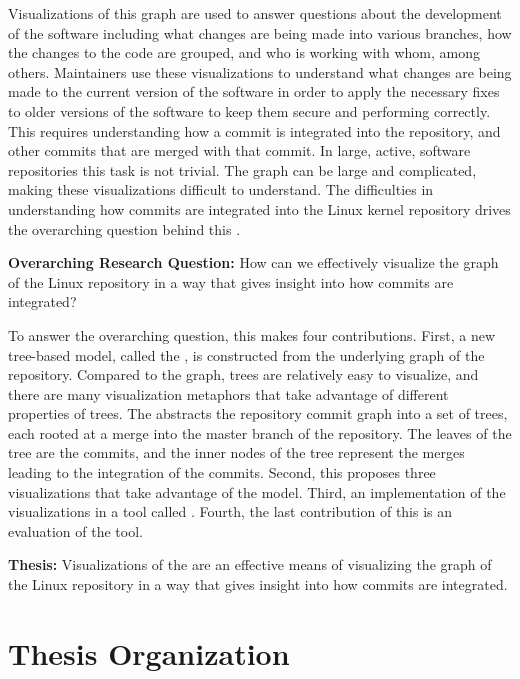 Visualizations of this graph are used to answer questions about the
development of the software including what changes are being made into
various branches, how the changes to the code are grouped, and who is
working with whom, among others. Maintainers use these visualizations to
understand what changes are being made to the current version of the
software in order to apply the necessary fixes to older versions of the
software to keep them secure and performing correctly. This requires
understanding how a commit is integrated into the repository, and other
commits that are merged with that commit. In large, active, software
repositories this task is not trivial.
The graph can be large and
complicated, making these visualizations difficult to understand.
The difficulties in understanding how commits are integrated into the
Linux kernel repository drives the overarching question behind this
\paper{}.

\begin{textbox}
  \textbf{Overarching Research Question:} How can we effectively
  visualize the graph of the Linux repository in a way that gives
  insight into how commits are integrated?
\end{textbox}

To answer the overarching question, this \paper{} makes four
contributions.
First, a new tree-based model, called the \mt{},
is constructed from the underlying graph of the repository.
Compared to the graph, trees are relatively easy to visualize, and there are many visualization metaphors that take advantage of different properties of trees.
The \mt{} abstracts the repository commit graph into a set of trees, each rooted at a merge into the master branch of the repository.
The leaves of the tree are the commits, and the inner nodes of the tree represent the merges leading to the integration of the commits.
Second, this \paper{} proposes three visualizations that take advantage of the \mt{} model.
Third, an implementation of the visualizations in a tool called \tool{}.
Fourth, the last contribution of this \paper{} is an evaluation of the
tool.

\begin{textbox}
  \textbf{Thesis:} Visualizations of the \mt{} are an effective means of
  visualizing the graph of the Linux repository in a way that gives
  insight into how commits are integrated.
\end{textbox}

\section{Thesis Organization}\label{sec:thesis_organization}

